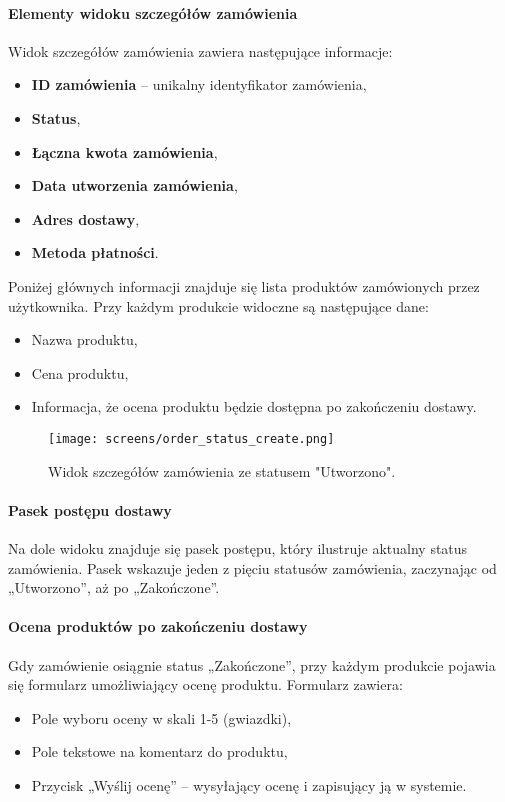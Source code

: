 \documentclass[12pt,a4paper,oneside]{article}
\theoremstyle{definition}
\numberwithin{equation}{section}
\begin{document}
\paragraph{Elementy widoku szczegółów zamówienia}
Widok szczegółów zamówienia zawiera następujące informacje:
\begin{itemize}
    \item \textbf{ID zamówienia} – unikalny identyfikator zamówienia,
    \item \textbf{Status},
    \item \textbf{Łączna kwota zamówienia},
    \item \textbf{Data utworzenia zamówienia},
    \item \textbf{Adres dostawy},
    \item \textbf{Metoda płatności}.
\end{itemize}

Poniżej głównych informacji znajduje się lista produktów zamówionych przez użytkownika. Przy każdym produkcie widoczne są następujące dane:
\begin{itemize}
    \item Nazwa produktu,
    \item Cena produktu,
    \item Informacja, że ocena produktu będzie dostępna po zakończeniu dostawy.
\end{itemize}
\begin{figure}[H]
    \centering
    \texttt{[image: screens/order\_status\_create.png]}
    \caption{Widok szczegółów zamówienia ze statusem "Utworzono".}
    \label{fig:order_status_create}
\end{figure}
\paragraph{Pasek postępu dostawy}
Na dole widoku znajduje się pasek postępu, który ilustruje aktualny status zamówienia. Pasek wskazuje jeden z pięciu statusów zamówienia, zaczynając od „Utworzono”, aż po „Zakończone”.

\paragraph{Ocena produktów po zakończeniu dostawy}
Gdy zamówienie osiągnie status „Zakończone”, przy każdym produkcie pojawia się formularz umożliwiający ocenę produktu. Formularz zawiera:
\begin{itemize}
    \item Pole wyboru oceny w skali 1-5 (gwiazdki),
    \item Pole tekstowe na komentarz do produktu,
    \item Przycisk „Wyślij ocenę” – wysyłający ocenę i zapisujący ją w systemie.
\end{itemize}
\end{document}
